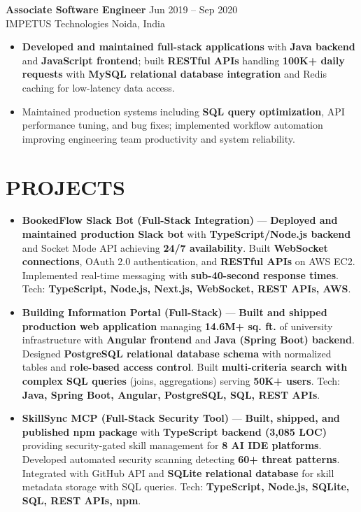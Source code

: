 \documentclass[letterpaper,10pt]{article}
\newcommand{\resumeItem}[1]{\item\small #1}
\newcommand{\resumeSubheading}[4]{
  \vspace{6pt}
  \noindent
  \textbf{#1} \hfill {\footnotesize #2} \\
  [-1pt]
  \noindent
  \small #3 \hfill {\small #4}
  \vspace{3pt}
}
\newcommand{\resumeItemsStart}{\vspace{-2pt}\begin{itemize}}
\newcommand{\resumeItemsEnd}{\end{itemize}\vspace{6pt}}
\begin{document}
\resumeSubheading
{Associate Software Engineer}{Jun 2019 -- Sep 2020}
{IMPETUS Technologies}{Noida, India}
\resumeItemsStart
\resumeItem{\textbf{Developed and maintained full-stack applications} with \textbf{Java backend} and \textbf{JavaScript frontend}; built \textbf{RESTful APIs} handling \textbf{100K+ daily requests} with \textbf{MySQL relational database integration} and Redis caching for low-latency data access.}
\resumeItem{Maintained production systems including \textbf{SQL query optimization}, API performance tuning, and bug fixes; implemented workflow automation improving engineering team productivity and system reliability.}
\resumeItemsEnd
\vspace{-8pt}

\section{\textcolor{metablue}{PROJECTS}}
\vspace{-6pt}
\begin{tcolorbox}[colback=white,colframe=metablue,boxrule=0.8pt,arc=2pt,left=4pt,right=4pt,top=2pt,bottom=2pt,before skip=0pt,after skip=0pt]
\begin{itemize}[topsep=0pt,partopsep=0pt]
\resumeItem{\textbf{BookedFlow Slack Bot (Full-Stack Integration)} --- \textbf{Deployed and maintained production Slack bot} with \textbf{TypeScript/Node.js backend} and Socket Mode API achieving \textbf{24/7 availability}. Built \textbf{WebSocket connections}, OAuth 2.0 authentication, and \textbf{RESTful APIs} on AWS EC2. Implemented real-time messaging with \textbf{sub-40-second response times}. Tech: \textbf{TypeScript, Node.js, Next.js, WebSocket, REST APIs, AWS}.}
\resumeItem{\textbf{Building Information Portal (Full-Stack)} --- \textbf{Built and shipped production web application} managing \textbf{14.6M+ sq. ft.} of university infrastructure with \textbf{Angular frontend} and \textbf{Java (Spring Boot) backend}. Designed \textbf{PostgreSQL relational database schema} with normalized tables and \textbf{role-based access control}. Built \textbf{multi-criteria search with complex SQL queries} (joins, aggregations) serving \textbf{50K+ users}. Tech: \textbf{Java, Spring Boot, Angular, PostgreSQL, SQL, REST APIs}.}
\resumeItem{\textbf{SkillSync MCP (Full-Stack Security Tool)} --- \textbf{Built, shipped, and published npm package} with \textbf{TypeScript backend (3,085 LOC)} providing security-gated skill management for \textbf{8 AI IDE platforms}. Developed automated security scanning detecting \textbf{60+ threat patterns}. Integrated with GitHub API and \textbf{SQLite relational database} for skill metadata storage with SQL queries. Tech: \textbf{TypeScript, Node.js, SQLite, SQL, REST APIs, npm}.}
\end{itemize}
\end{tcolorbox}
\vspace{-5pt}
\end{document}
